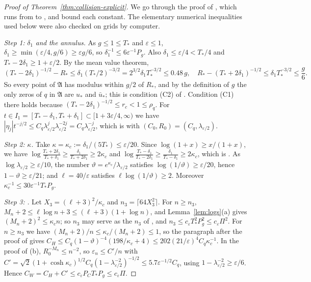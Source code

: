 \documentclass[11pt]{amsart}
\theoremstyle{definition}
\theoremstyle{remark}
\numberwithin{equation}{section}
\newcommand{\eps}{\varepsilon}
\begin{document}
\begin{proof}[Proof of Theorem~\ref{thm:collision-explicit}]
We go through the proof of \cite[Theorem~\ref{M-thm:collision}]{Main}, which runs from \cite[Section~\ref{M-subsec:collision-rate}]{Main} to \cite[Section~\ref{M-subsec:collision-proof}]{Main}, and bound each constant. The elementary numerical inequalities used below were also checked on grids by computer.

\emph{Step 1: $\delta_1$ and the annulus.} As $g\le1\le T_*$ and $\eps\le1$, $\delta_1\ge\min(\eps/4,g/6)\ge\eps g/6$, so $\delta_1^{-1}\le6\eps^{-1}P_g$. Also $\delta_1\le\eps/4<T_*/4$ and $T_*-2\delta_1\ge1+\eps/2$. By the mean value theorem,
\[
(T_*-2\delta_1)^{-1/2}-R_*\le\delta_1(T_*/2)^{-3/2}=2^{3/2}\delta_1T_*^{-3/2}\le0.48\,g,\quad R_*-(T_*+2\delta_1)^{-1/2}\le\delta_1T_*^{-3/2}\le\frac g6 .
\]
So every point of $\mathfrak A$ has modulus within $g/2$ of $R_*$, and by the definition of $g$ the only zeros of $q$ in $\mathfrak A$ are $u_*$ and $\bar u_*$; this is condition (C2) of \cite[Section~\ref{M-subsec:collision-limit}]{Main}. Condition (C1) there holds because $(T_*-2\delta_1)^{-1/2}\le r_c<1\le\rho_q$. For $t\in I_1=[T_*-\delta_1,T_*+\delta_1]\subset[1+3\eps/4,\infty)$ we have $|\eta_j|t^{-j/2}\le C_q\lambda_{\eps/2}^j\lambda_{\eps/2}^{-2j}=C_q\lambda_{\eps/2}^{-j}$, which is \cite[\eqref{M-eq:collision-H1}]{Main} with $(C_0,R_0)=(C_q,\lambda_{\eps/2})$.

\emph{Step 2: $\kappa$.} Take $\kappa=\kappa_c:=\delta_1/(5T_*)\le\eps/20$. Since $\log(1+x)\ge x/(1+x)$, we have $\log\frac{T_*+2\delta_1}{T_*+\delta_1}\ge\frac{\delta_1}{T_*+2\delta_1}\ge2\kappa_c$ and $\log\frac{T_*-\delta_1}{T_*-2\delta_1}\ge\frac{\delta_1}{T_*-\delta_1}\ge2\kappa_c$, which is \cite[\eqref{M-eq:collision-kappa}]{Main}. As $\log\lambda_{\eps/2}\ge\eps/10$, the number $\vartheta=e^{\kappa_c}/\lambda_{\eps/2}$ satisfies $\log(1/\vartheta)\ge\eps/20$, hence $1-\vartheta\ge\eps/21$; and $\ell=40/\eps$ satisfies $\ell\log(1/\vartheta)\ge2$. Moreover $\kappa_c^{-1}\le30\eps^{-1}T_*P_g$.

\emph{Step 3: \cite[Proposition~\ref{M-prop:bulkrate}]{Main}.} Let $X_3=(\ell+3)^2/\kappa_c$ and $n_3=\lceil64X_3^2\rceil$. For $n\ge n_3$, $M_n+2\le\ell\log n+3\le(\ell+3)(1+\log n)$, and Lemma~\ref{lem:logs}(a) gives $(M_n+2)^2\le\kappa_cn$; so $n_3$ may serve as the $n_3$ of \cite[Proposition~\ref{M-prop:bulkrate}]{Main}, and $n_3\le c_\eps T_*^2P_g^2\le c_\eps\Pi^2$. For $n\ge n_3$ we have $(M_n+2)/n\le\kappa_c/(M_n+2)\le1$, so the paragraph after the proof of \cite[Proposition~\ref{M-prop:bulkrate}]{Main} gives $C_H\le C_q(1-\vartheta)^{-4}(198/\kappa_c+4)\le202(21/\eps)^4C_q\kappa_c^{-1}$. In the proof of \cite[Proposition~\ref{M-prop:bulkrate}]{Main}(b), $R_0^{-M_n}\le n^{-2}$, so $\eps_n\le C'/n$ with $C'=\sqrt2(1+\cosh\kappa_c)^{1/2}C_q(1-\lambda_{\eps/2}^{-2})^{-1/2}\le5.7\eps^{-1/2}C_q$, using $1-\lambda_{\eps/2}^{-2}\ge\eps/6$. Hence $C_W=C_H+C'\le c_\eps P_CT_*P_g\le c_\eps\Pi$.


\end{proof}
\end{document}
